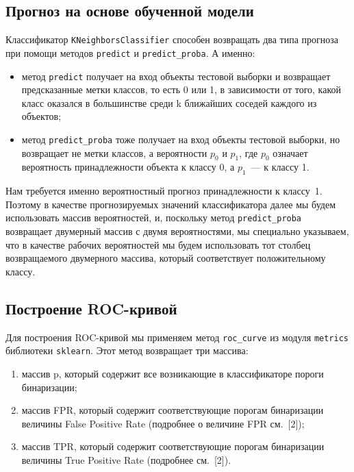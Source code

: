 \subsection{Прогноз на основе обученной модели}

Классификатор \texttt{KNeighborsClassifier} способен возвращать два типа прогноза при помощи методов \texttt{predict} и \texttt{predict\_proba}. А именно:

\medskip

\begin{itemize}
	\item метод \texttt{predict} получает на вход объекты тестовой выборки и возвращает предсказанные метки классов, то есть 0 или 1, в зависимости от того, какой класс оказался в большинстве среди k ближайших соседей каждого из объектов;
	\item метод \texttt{predict\_proba} тоже получает на вход объекты тестовой выборки, но возвращает не метки классов, а вероятности $p_0$ и $p_1$, где $p_0$ означает вероятность принадлежности объекта к классу 0, а $p_1$~--- к классу 1.
\end{itemize}

\medskip
\noindent
Нам требуется именно вероятностный прогноз принадлежности к классу~1. Поэтому в качестве прогнозируемых значений классификатора далее мы будем использовать массив вероятностей, и, поскольку метод \texttt{predict\_proba} возвращает двумерный массив с двумя вероятностями, мы специально указываем, что в качестве рабочих вероятностей мы будем использовать тот столбец возвращаемого двумерного массива, который соответствует положительному классу.

\subsection{ Построение ROC-кривой}
Для построения ROC-кривой мы применяем метод \texttt{roc\_curve} из модуля \texttt{metrics} библиотеки \texttt{sklearn}. Этот метод возвращает три массива:
\medskip


\begin{enumerate}
	\item массив p, который содержит все возникающие в классификаторе пороги бинаризации;
	\item массив FPR, который содержит соответствующие порогам бинаризации величины False Positive Rate (подробнее о величине FPR см. [2]);
	\item массив TPR, который содержит соответствующие порогам бинаризации величины True Positive Rate (подробнее см. [2]).
\end{enumerate}


